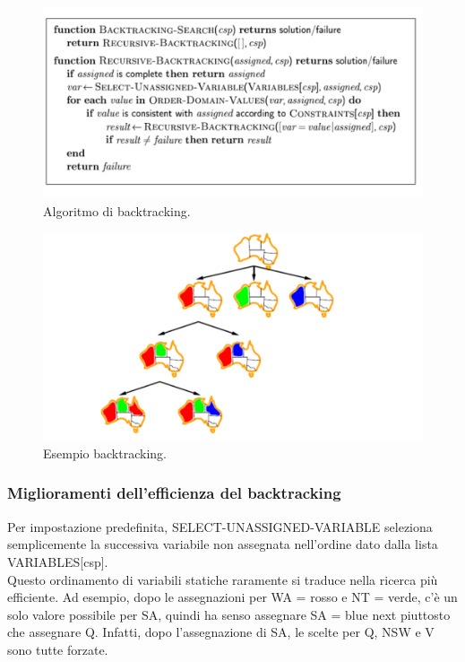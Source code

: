 \begin{figure}[htp]
	\centering
    \includegraphics[width=12cm, keepaspectratio]{img/Cap2/dfs.png}
    \caption{Algoritmo di backtracking.}
\end{figure}
\begin{figure}[htp]
	\centering
    \includegraphics[width=12cm, keepaspectratio]{img/Cap2/dfs2.png}
    \caption{Esempio backtracking.}
\end{figure}
\subsubsection{Miglioramenti dell’efficienza del backtracking}
Per impostazione predefinita, SELECT-UNASSIGNED-VARIABLE seleziona semplicemente la successiva variabile non assegnata nell’ordine dato dalla lista VARIABLES[csp]. 
\\Questo ordinamento di variabili statiche raramente si traduce nella ricerca più efficiente. Ad esempio, dopo le assegnazioni per WA = rosso e NT = verde, c’è un solo valore possibile per SA, quindi ha senso assegnare SA = blue next piuttosto che assegnare Q. Infatti, dopo l’assegnazione di SA, le scelte per Q, NSW e V sono tutte forzate.

